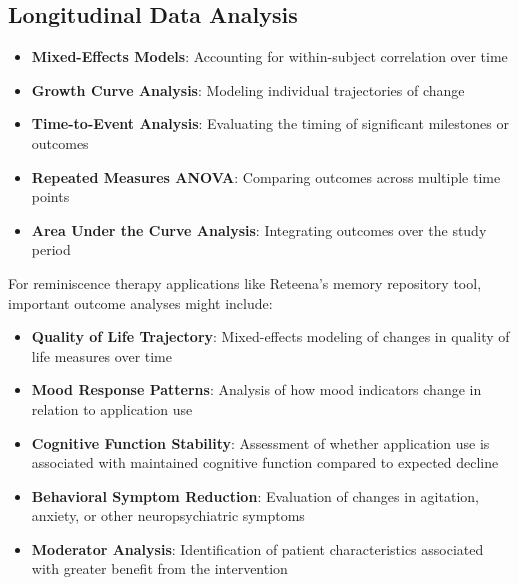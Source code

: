 \subsection{Longitudinal Data Analysis}
\begin{itemize}
    \item \textbf{Mixed-Effects Models}: Accounting for within-subject correlation over time
    
    \item \textbf{Growth Curve Analysis}: Modeling individual trajectories of change
    
    \item \textbf{Time-to-Event Analysis}: Evaluating the timing of significant milestones or outcomes
    
    \item \textbf{Repeated Measures ANOVA}: Comparing outcomes across multiple time points
    
    \item \textbf{Area Under the Curve Analysis}: Integrating outcomes over the study period
\end{itemize}

\begin{tcolorbox}[infobox, title=Analysis Approaches for Reminiscence Therapy Applications]
For reminiscence therapy applications like Reteena's memory repository tool, important outcome analyses might include:
\begin{itemize}
    \item \textbf{Quality of Life Trajectory}: Mixed-effects modeling of changes in quality of life measures over time
    
    \item \textbf{Mood Response Patterns}: Analysis of how mood indicators change in relation to application use
    
    \item \textbf{Cognitive Function Stability}: Assessment of whether application use is associated with maintained cognitive function compared to expected decline
    
    \item \textbf{Behavioral Symptom Reduction}: Evaluation of changes in agitation, anxiety, or other neuropsychiatric symptoms
    
    \item \textbf{Moderator Analysis}: Identification of patient characteristics associated with greater benefit from the intervention
\end{itemize}
\end{tcolorbox}

